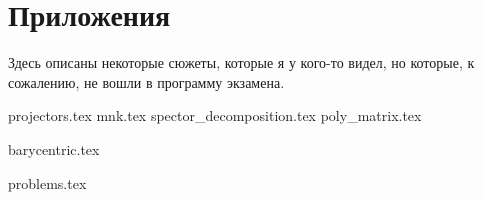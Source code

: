\documentclass[a4paper, 11pt]{article}
\begin{document}
\newpage

\setcounter{problem}{0}

\section{Приложения}

Здесь описаны некоторые сюжеты, которые я у кого-то видел, но которые, к сожалению, не вошли в программу экзамена.

{projectors.tex}
{mnk.tex}
{spector_decomposition.tex}
{poly_matrix.tex}

\renewcommand{\A}{\mathfrak{A}}
\renewcommand{\B}{\mathfrak{B}}

{barycentric.tex}

\renewcommand{\A}{\mathcal{A}}
\renewcommand{\B}{\mathcal{B}}

\newpage

\setcounter{problem}{0}

{problems.tex}
\end{document}

